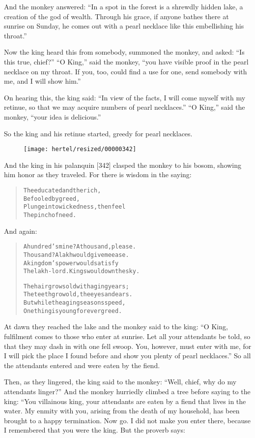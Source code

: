 \documentclass[article, twoside, 10pt]{memoir}
\renewenvironment{verbatim}{%
\begin{quote}%
\vskip -10pt%
\begin{alltt}\normalfont\small}{\end{alltt}%
\end{quote}%
\vskip -10pt
} %
\begin{document}
And the monkey answered:
``In a spot in the forest is a shrewdly hidden lake, a creation of the god of wealth. Through his grace, if anyone bathes there at sunrise on Sunday, he comes out with a pearl necklace like this embellishing his throat.''

Now the king heard this from somebody, summoned the monkey, and
asked: ``Is this true, chief?'' ``O King,'' said the monkey,
``you have visible proof in the pearl necklace on my throat. If you, too, could find a use for one, send somebody with me, and I will show him.''

On hearing this, the king said:
``In view of the facts, I will come myself with my retinue, so that we may acquire numbers of pearl necklaces.''
``O King,'' said the monkey, ``your idea is delicious.''

So the king and his retinue started, greedy for pearl necklaces.
\begin{figure}[p]\texttt{[image: hertel/resized/00000342]}\end{figure}And the king in his palanquin [342] clasped the monkey to his
bosom, showing him honor as they traveled. For there is wisdom in
the saying:

\begin{verbatim}
The educated and the rich,
    Befooled by greed,
Plunge into wickedness, then feel
    The pinch of need.
\end{verbatim}
And again:

\begin{verbatim}
A hundred's mine? A thousand, please.
Thousand? A lakh would give me ease.
A kingdom's power would satisfy
The lakh-lord. Kings would own the sky.

The hair grows old with aging years;
The teeth grow old, the eyes and ears.
But while the aging seasons speed,
One thing is young forever{\textemdash}greed.
\end{verbatim}
At dawn they reached the lake and the monkey said to the king:
``O King, fulfilment comes to those who enter at sunrise. Let all your attendants be told, so that they may dash in with one fell swoop. You, however, must enter with me, for I will pick the place I found before and show you plenty of pearl necklaces.''
So all the attendants entered and were eaten by the fiend.

Then, as they lingered, the king said to the monkey:
``Well, chief, why do my attendants linger?'' And the monkey
hurriedly climbed a tree before saying to the king: “You villainous
king, your attendants are eaten by a fiend that lives in the water.
My enmity with you, arising from the death of my household, has
been brought to a happy termination. Now go. I did not make you
enter there, because I remembered that you were the king. But the
proverb says:
\end{document}
